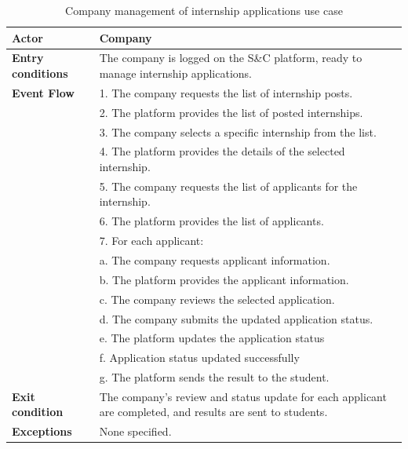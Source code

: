 \begin{table}[h!]
    \centering
    \begin{tabular}{lp{10cm}}
        \textbf{Actor} & Company \\ \hline
        \textbf{Entry conditions} & The company is logged on the S\&C platform, ready to manage internship applications. \\ \hline
        \textbf{Event Flow} &
        1. The company requests the list of internship posts. \\
        & 2. The platform provides the list of posted internships. \\
        & 3. The company selects a specific internship from the list. \\
        & 4. The platform provides the details of the selected internship. \\
        & 5. The company requests the list of applicants for the internship. \\
        & 6. The platform provides the list of applicants. \\
        & 7. For each applicant: \\
        & \quad a. The company requests applicant information. \\
        & \quad b. The platform provides the applicant information. \\
        & \quad c. The company reviews the selected application. \\
        & \quad d. The company submits the updated application status. \\
        & \quad e. The platform updates the application status \\
        & \quad f. Application status updated successfully \\
        & \quad g. The platform sends the result to the student. \\
        \hline
        \textbf{Exit condition} & The company's review and status update for each applicant are completed, and results are sent to students. \\ \hline
        \textbf{Exceptions} & None specified. \\
    \end{tabular}
    \caption{Company management of internship applications use case}
    \label{tab:company_manage_internship_applications}
\end{table}


